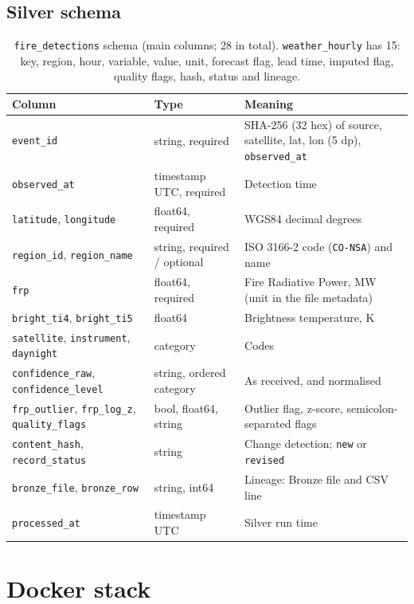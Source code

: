 \documentclass[11pt,a4paper]{article}
\newcommand{\code}[1]{\texttt{\small #1}}
\begin{document}
\subsection{Silver schema}

\begin{table}[H]
\centering
\small
\begin{tabular}{L{3.0cm}L{3.0cm}L{8.5cm}}
\toprule
\textbf{Column} & \textbf{Type} & \textbf{Meaning} \\
\midrule
\code{event\_id} & string, required & SHA-256 (32 hex) of source, satellite, lat, lon (5 dp), \code{observed\_at} \\
\code{observed\_at} & timestamp UTC, required & Detection time \\
\code{latitude}, \code{longitude} & float64, required & WGS84 decimal degrees \\
\code{region\_id}, \code{region\_name} & string, required / optional & ISO 3166-2 code (\code{CO-NSA}) and name \\
\code{frp} & float64, required & Fire Radiative Power, MW (unit in the file metadata) \\
\code{bright\_ti4}, \code{bright\_ti5} & float64 & Brightness temperature, K \\
\code{satellite}, \code{instrument}, \code{daynight} & category & Codes \\
\code{confidence\_raw}, \code{confidence\_level} & string, ordered category & As received, and normalised \\
\code{frp\_outlier}, \code{frp\_log\_z}, \code{quality\_flags} & bool, float64, string & Outlier flag, z-score, semicolon-separated flags \\
\code{content\_hash}, \code{record\_status} & string & Change detection; \code{new} or \code{revised} \\
\code{bronze\_file}, \code{bronze\_row} & string, int64 & Lineage: Bronze file and CSV line \\
\code{processed\_at} & timestamp UTC & Silver run time \\
\bottomrule
\end{tabular}
\caption{\code{fire\_detections} schema (main columns; 28 in total). \code{weather\_hourly} has 15:
key, region, hour, variable, value, unit, forecast flag, lead time, imputed flag, quality flags, hash,
status and lineage.}
\label{tab:schema}
\end{table}

\section{Docker stack}
\end{document}
